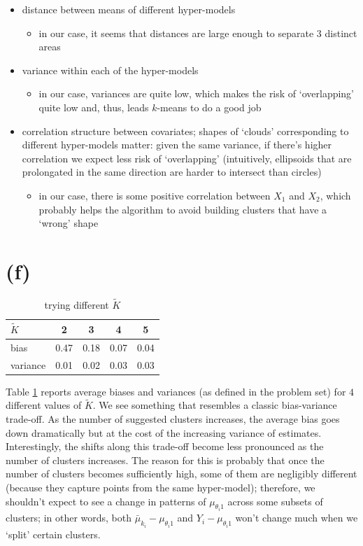 \documentclass[a4paper,12pt,twoside]{article}
\begin{document}
\begin{itemize}
  \item distance between means of different hyper-models
	\begin{itemize}
	  \item in our case, it seems that distances are large enough to separate $3$ distinct areas
	\end{itemize}
  \item variance within each of the hyper-models
	\begin{itemize}
	  \item in our case, variances are quite low, which makes the risk of `overlapping' quite low and, thus, leads $k$-means to do a good job
	\end{itemize}
  \item correlation structure between covariates; shapes of `clouds' corresponding to different hyper-models matter: given the same variance, if there's higher correlation we expect less risk of `overlapping' (intuitively, ellipsoids that are prolongated in the same direction are harder to intersect than circles)
	\begin{itemize}
	  \item in our case, there is some positive correlation between $X_1$ and $X_2$, which probably helps the algorithm to avoid building clusters that have a `wrong' shape
	\end{itemize}
\end{itemize}


\section*{(f)}

\begin{table}[h]
\centering
\caption{trying different \( \tilde K \)}
\label{tab:k_tilde}
\begin{tabular}{lcccc}
\toprule
\( \tilde K \) & 2 & 3 & 4 & 5 \\ 
  \midrule
bias & 0.47 & 0.18 & 0.07 & 0.04 \\ 
variance & 0.01 & 0.02 & 0.03 & 0.03 \\ 
\bottomrule
\end{tabular}
\end{table}

Table \ref{tab:k_tilde} reports average biases and variances (as defined in the problem set) for \( 4 \) different values of $\tilde K$. We see something that resembles a classic bias-variance trade-off. As the number of suggested clusters increases, the average bias goes down dramatically but at the cost of the increasing variance of estimates. Interestingly, the shifts along this trade-off become less pronounced as the number of clusters increases. The reason for this is probably that once the number of clusters becomes sufficiently high, some of them are negligibly different (because they capture points from the same hyper-model); therefore, we shouldn't expect to see a change in patterns of $ \mu_{\theta_i 1}$ across some subsets of clusters; in other words, both $\bar \mu_{k_i} - \mu_{\theta_i 1}$ and $Y_i - \mu_{\theta_i 1}$ won't change much when we `split' certain clusters.
\end{document}
